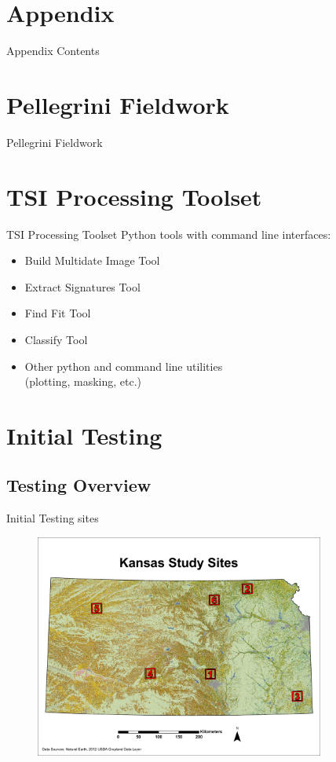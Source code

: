 \documentclass[  compress,xcolor={usenames,dvipsnames}]{beamer}
\begin{document}
\section*{Appendix}

\begin{frame}{Appendix Contents}
  \tableofcontents
\end{frame}

\section{Pellegrini Fieldwork}
\begin{frame}{Pellegrini Fieldwork}
\end{frame}

\section{TSI Processing Toolset}
\begin{frame}{TSI Processing Toolset}
Python tools with command line interfaces:
\begin{itemize}
  \item Build Multidate Image Tool
  \item Extract Signatures Tool
  \item Find Fit Tool
  \item Classify Tool
  \item Other python and command line utilities\\(plotting, masking, etc.)
\end{itemize}
\end{frame}
 

\section{Initial Testing}

\subsection{Testing Overview}
\begin{frame}{Initial Testing sites}
\begin{figure}
  \centering
  \includegraphics[width=0.85\textwidth]{Graphics/Testing/STUDYSITES.pdf}
\end{figure}
\end{frame}
\end{document}
